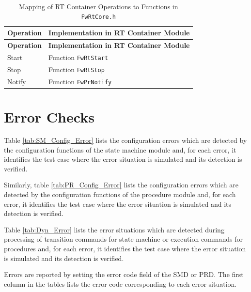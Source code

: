 \documentclass[requirements]{../fwprofile}
\begin{document}
\begin{longtable}{|p{3.7cm}|p{7.5cm}|}
\caption{Mapping of RT Container Operations to Functions in \texttt{FwRtCore.h}} 
\label{tab:RT_Operations_Implementation}\\
\hline
\rowcolor{gray}
\textbf{Operation} & \textbf{Implementation in RT Container Module} \\
\hline
\endfirsthead
\rowcolor{gray}
\textbf{Operation} & \textbf{Implementation in RT Container Module} \\
\hline
\endhead
Start & Function \texttt{FwRtStart} \\
\hline
Stop  & Function \texttt{FwRtStop} \\
\hline
Notify & Function \texttt{FwPrNotify} \\
\hline
\end{longtable}




\section{Error Checks}\label{Appendix_B_Error_Checks}
Table \ref{tab:SM_Config_Error} lists the configuration errors which are detected by 
the configuration functions of the state machine module and, for each error, it 
identifies the test case where the error situation is simulated 
and its detection is verified.

Similarly, table \ref{tab:PR_Config_Error} lists the configuration errors which are 
detected by the configuration functions of the procedure module and, for each error, 
it identifies the test case where the error situation is simulated and its detection is verified.

Table \ref{tab:Dyn_Error} lists the error situations which are detected during processing 
of transition commands for state machine or execution commands for procedures and, for each error, it identifies the test case where the error situation is simulated and its detection is verified.

Errors are reported by setting the error code field of the SMD or PRD. 
The first column in the tables lists the error code corresponding to each error situation.
\end{document}

